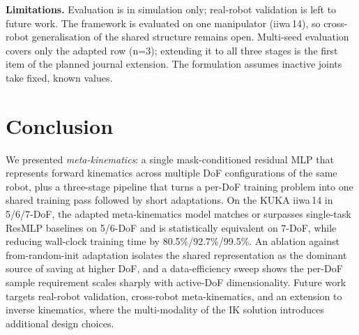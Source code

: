 \documentclass[conference]{IEEEtran}
\begin{document}
\textbf{Limitations.} Evaluation is in simulation only; real-robot validation is left to future work. The framework is evaluated on one manipulator (iiwa\,14), so cross-robot generalisation of the shared structure remains open. Multi-seed evaluation covers only the adapted row (n=3); extending it to all three stages is the first item of the planned journal extension. The formulation assumes inactive joints take fixed, known values.

\section{Conclusion}\label{sec:conclusion}

We presented \emph{meta-kinematics}: a single mask-conditioned residual MLP that represents forward kinematics across multiple DoF configurations of the same robot, plus a three-stage pipeline that turns a per-DoF training problem into one shared training pass followed by short adaptations. On the KUKA iiwa\,14 in 5/6/7-DoF, the adapted meta-kinematics model matches or surpasses single-task ResMLP baselines on 5/6-DoF and is statistically equivalent on 7-DoF, while reducing wall-clock training time by 80.5\%/92.7\%/99.5\%. An ablation against from-random-init adaptation isolates the shared representation as the dominant source of saving at higher DoF, and a data-efficiency sweep shows the per-DoF sample requirement scales sharply with active-DoF dimensionality. Future work targets real-robot validation, cross-robot meta-kinematics, and an extension to inverse kinematics, where the multi-modality of the IK solution introduces additional design choices.
\end{document}
